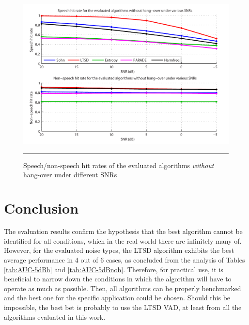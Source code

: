 \begin{figure}[htbp]
	\centering
		\includegraphics[width=0.9\columnwidth]{Figures/Chapter4/snrnohbold.pdf}
		\rule{37em}{0.5pt}
	\caption[Speech/non-speech hit rates of the evaluated algorithms \emph{without} hang-over under different SNRs]{Speech/non-speech hit rates of the evaluated algorithms \emph{without} hang-over under different SNRs}
	\label{fig:snrnoh}
\end{figure}


\section{Conclusion}

The evaluation results confirm the hypothesis that the best algorithm cannot be identified for all conditions, which in the real world there are infinitely many of. However, for the evaluated noise types, the LTSD algorithm exhibits the best average performance in 4 out of 6 cases, as concluded from the analysis of Tables \ref{tab:AUC-5dBh} and \ref{tab:AUC-5dBnoh}. Therefore, for practical use, it is beneficial to narrow down the conditions in which the algorithm will have to operate as much as possible. Then, all algorithms can be properly benchmarked and the best one for the specific application could be chosen. Should this be impossible, the best bet is probably to use the LTSD VAD, at least from all the algorithms evaluated in this work.